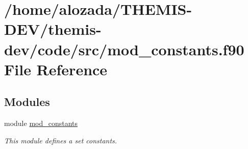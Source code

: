 \hypertarget{mod__constants_8f90}{}\section{/home/alozada/\+T\+H\+E\+M\+I\+S-\/\+D\+E\+V/themis-\/dev/code/src/mod\+\_\+constants.f90 File Reference}
\label{mod__constants_8f90}
\subsection*{Modules}
\begin{DoxyCompactItemize}
\item 
module \hyperlink{namespacemod__constants}{mod\+\_\+constants}
\begin{DoxyCompactList}\small\item\em This module defines a set constants. \end{DoxyCompactList}\end{DoxyCompactItemize}
